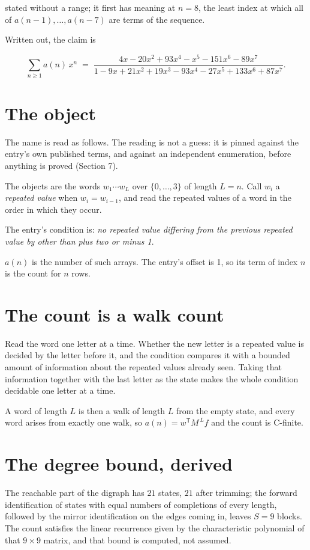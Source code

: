 \documentclass[11pt]{article}
\theoremstyle{definition}
\begin{document}
stated without a range; it first has meaning at $n = 8$, the least index at which all of $a(n-1),\dots,a(n-7)$ are terms of the sequence.

Written out, the claim is

\[\sum_{n \ge 1} a(n)\,x^n \;=\; \frac{4x - 20x^{2} + 93x^{4} - x^{5} - 151x^{6} - 89x^{7}}{1 - 9x + 21x^{2} + 19x^{3} - 93x^{4} - 27x^{5} + 133x^{6} + 87x^{7}}.\]

\section{The object}

The name is read as follows. The reading is not a guess: it is pinned against the entry's own published terms, and against an independent enumeration, before anything is proved (Section 7).

The objects are the words $w_1\cdots w_L$ over $\{0,\dots,3\}$ of length $L = n$. Call $w_i$ a {\itshape repeated value} when $w_i = w_{i-1}$, and read the repeated values of a word in the order in which they occur.

The entry's condition is: {\itshape no repeated value differing from the previous repeated value by other than plus two or minus 1}.

$a(n)$ is the number of such arrays. The entry's offset is 1, so its term of index $n$ is the count for $n$ rows.

\section{The count is a walk count}

Read the word one letter at a time. Whether the new letter is a repeated value is decided by the letter before it, and the condition compares it with a bounded amount of information about the repeated values already seen. Taking that information together with the last letter as the state makes the whole condition decidable one letter at a time.

A word of length $L$ is then a walk of length $L$ from the empty state, and every word arises from exactly one walk, so $a(n) = w^{\mathsf T}M^{\,L}f$ and the count is C-finite.

\section{The degree bound, derived}

The reachable part of the digraph has $21$ states, $21$ after trimming; the forward identification of states with equal numbers of completions of every length, followed by the mirror identification on the edges coming in, leaves $S = 9$ blocks. The count satisfies the linear recurrence given by the characteristic polynomial of that $9\times9$ matrix, and that bound is computed, not assumed.
\end{document}
